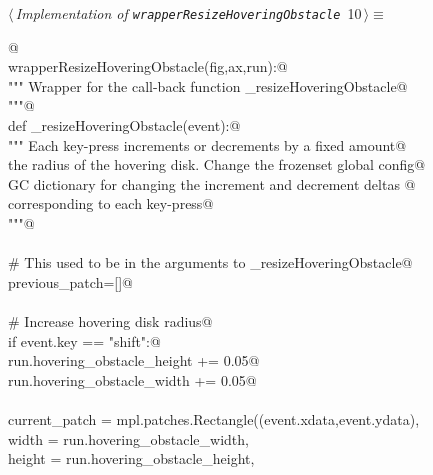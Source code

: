\documentclass[11.5pt]{report}
\begin{document}
\begin{flushleft} \small\label{scrap10}\raggedright\small
{} $\langle\,${\itshape Implementation of \verb|wrapperResizeHoveringObstacle|}\nobreak\ {\footnotesize {10}}$\,\rangle\equiv$
\vspace{-1ex}
\begin{list}{}{} \item
\mbox{}\verb@   @\\
\mbox{}\verb@def wrapperResizeHoveringObstacle(fig,ax,run):@\\
\mbox{}\verb@        """ Wrapper for the call-back function _resizeHoveringObstacle@\\
\mbox{}\verb@        """@\\
\mbox{}\verb@        def _resizeHoveringObstacle(event):@\\
\mbox{}\verb@            """ Each key-press increments or decrements by a fixed amount@\\
\mbox{}\verb@            the radius of the hovering disk. Change the frozenset global config@\\
\mbox{}\verb@            GC dictionary for changing the increment and decrement deltas @\\
\mbox{}\verb@            corresponding to each key-press@\\
\mbox{}\verb@            """@\\
\mbox{}\verb@@\\
\mbox{}\verb@            # This used to be in the arguments to _resizeHoveringObstacle@\\
\mbox{}\verb@            previous_patch=[]@\\
\mbox{}\verb@@\\
\mbox{}\verb@            # Increase hovering disk radius@\\
\mbox{}\verb@            if  event.key  == "shift":@\\
\mbox{}\verb@                run.hovering_obstacle_height += 0.05@\\
\mbox{}\verb@                run.hovering_obstacle_width  += 0.05@\\
\mbox{}\verb@@\\
\mbox{}\verb@                current_patch = mpl.patches.Rectangle((event.xdata,event.ydata),         \@\\
\mbox{}\verb@                                                   width     = run.hovering_obstacle_width,  \@\\
\mbox{}\verb@                                                   height    = run.hovering_obstacle_height, \@\\

\end{list}
\end{flushleft}
\end{document}
